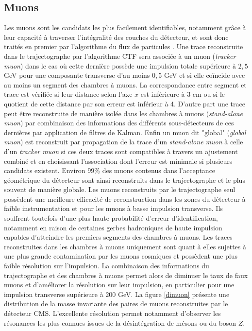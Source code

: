 \subsection{Muons}
\label{MuonID}

Les muons sont les candidats les plus facilement identifiables, notamment grâce à leur capacité à traverser l'intégralité des couches du détecteur, et sont donc traités en premier par l'algorithme du flux de particules \cite{Sirunyan:2313130}. Une trace reconstruite dans le trajectographe par l'algorithme CTF sera associée à un muon (\textit{tracker muon}) dans le cas où cette dernière possède une impulsion totale supérieure à $2,5$ GeV pour une composante transverse d'au moins $0,5$ GeV et si elle coïncide avec au moins un segment des chambres à muons. La correspondance entre segment et trace est vérifiée si leur distance selon l'axe $x$ est inférieure à $3$ cm ou si le quotient de cette distance par son erreur est inférieur à 4. D'autre part une trace peut être reconstruite de manière isolée dans les chambres à muons (\textit{stand-alone muon}) par combinaison des informations des différents sous-détecteurs de ces dernières par application de filtres de Kalman. Enfin un muon dit "global" (\textit{global muon}) est reconstruit par propagation de la trace d'un \textit{stand-alone muon} à celle d'un \textit{tracker muon} si ces deux traces sont compatibles à travers un ajustement combiné et en choisissant l'association dont l'erreur est minimale si plusieurs candidats existent. Environ $99$\% des muons contenus dans l'acceptance géométrique du détecteur sont ainsi reconstruits dans le trajectographe et le plus souvent de manière globale. Les muons reconstruits par le trajectographe seul possèdent une meilleure efficacité de reconstruction dans les zones du détecteur à faible instrumentation et pour les muons à basse impulsion transverse. Ils souffrent toutefois d'une plus haute probabilité d'erreur d'identification, notamment en raison de certaines gerbes hadroniques de haute impulsion capables d'atteindre les premiers segments des chambres à muons. Les traces reconstruites dans les chambres à muons uniquement sont quant à elles sujettes à une plus grande contamination par les muons cosmiques et possèdent une plus faible résolution sur l'impulsion. La combinaison des informations du trajectographe et des chambres à muons permet alors de diminuer le taux de faux muons et d'améliorer la résolution sur leur impulsion, en particulier pour une impulsion transverse supérieure à $200$ GeV. La figure \ref{dimuon} présente une distribution de la masse invariante des paires de muons reconstruites par le détecteur CMS. L'excellente résolution permet notamment d'observer les résonances les plus connues issues de la désintégration de mésons ou du boson $Z$. \\

